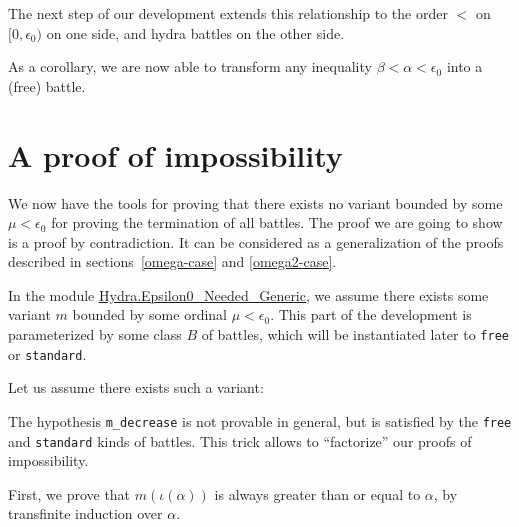

The next step of our development extends this relationship to
the order $<$ on $[0,\epsilon_0)$ on one side, and hydra battles on the other side.



As a corollary, we are now able to transform any inequality $\beta<\alpha<\epsilon_0$ into a (free) battle.




\section{A  proof of impossibility}

We now have  the tools for proving that  there exists no variant bounded by some $\mu<\epsilon_0$ for proving the termination   of all battles. The proof we are going to show is a proof by contradiction. It  can
 be considered as a generalization of the
proofs described in  sections~\vref{omega-case} and \vref{omega2-case}.



In the module
\href{../theories/html/hydras.Hydra.Epsilon0_Needed_Generic.html}{Hydra.Epsilon0\_Needed\_Generic}, we assume there exists some variant $m$ bounded by some ordinal $\mu<\epsilon_0$. This part of the development is parameterized by some class $B$ of battles, which will be instantiated later to \texttt{free} or \texttt{standard}.





Let us assume there exists such a variant:



\label{remark:m-decrease}
\begin{remark}
  The hypothesis \texttt{m\_decrease} is not provable  in general, but is satisfied by
the  \texttt{free} and \texttt{standard} kinds of battles. This trick allows to 
``factorize'' our proofs  of impossibility.
\end{remark}


First, we prove that $m(\iota(\alpha))$ is always greater than or equal to $\alpha$, by  transfinite induction over $\alpha$.




